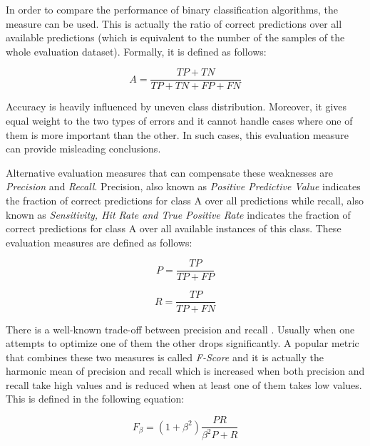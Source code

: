 In order to compare the performance of binary classification algorithms, the  measure can be used. This is actually the ratio of correct predictions over all available predictions (which is equivalent to the number of the samples of the whole evaluation dataset). Formally, it is defined as follows:

\begin{equation}\label{chap:eval_methods:eq:accuracy}
A = \frac {TP + TN} {TP +  TN + FP + FN}
\end{equation}

Accuracy is heavily influenced by uneven class distribution. Moreover, it gives equal weight to the two types of errors and it cannot handle cases where one of them is more important than the other. In such cases, this evaluation measure can provide misleading conclusions. 

Alternative evaluation measures that can compensate these weaknesses are \textit{Precision} and \textit{Recall}. Precision, also known as \textit{Positive Predictive Value} indicates the fraction of correct predictions for class A over all predictions while recall, also known as \textit{Sensitivity, Hit Rate and True Positive Rate} indicates the fraction of correct predictions for class A over all available instances of this class. These evaluation measures are defined as follows: 

\begin{equation}\label{chap:eval_methods:eq:precision}
	P = \frac {TP} {TP + FP}
\end{equation}

\begin{equation}\label{chap:eval_methods:eq:recall}
	R = \frac {TP} {TP + FN}
\end{equation}

There is a well-known trade-off between precision and recall \parencite{Weiss2010}. Usually when one attempts to optimize one of them the other drops significantly. A popular metric that combines these two measures is called \textit{F-Score} and it is actually the harmonic mean of precision and recall which is increased when both precision and recall take high values and is reduced when at least one of them takes low values. This is defined in the following equation:

\begin{equation}\label{chap:eval_methods:eq:recall}
	F_{\beta} = (1 + \beta^{2}) \frac {P R} {\beta^{2} P + R}
\end{equation}

